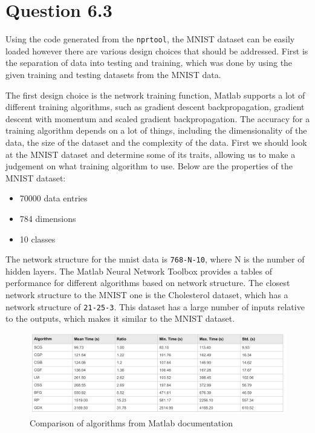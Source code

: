 \section*{Question 6.3}

Using the code generated from the \verb|nprtool|, the MNIST dataset can be easily loaded however there are various design choices that should be addressed.
First is the separation of data into testing and training, which was done by using the given training and testing datasets from the MNIST data.

The first design choice is the network training function, Matlab supports a lot of different training algorithms, such as gradient descent backpropagation, gradient descent with momentum and scaled gradient backpropagation.
The accuracy for a training algorithm depends on a lot of things, including the dimensionality of the data, the size of the dataset and the complexity of the data.
First we should look at the MNIST dataset and determine some of its traits, allowing us to make a judgement on what training algorithm to use.
Below are the properties of the MNIST dataset:
\begin{itemize}
    \item 70000 data entries
    \item 784 dimensions
    \item 10 classes
\end{itemize}

The network structure for the mnist data is \verb|768-N-10|, where N is the number of hidden layers.
The Matlab Neural Network Toolbox provides a tables of performance for different algorithms based on network structure.
The closest network structure to the MNIST one is the Cholesterol dataset, which has a network structure of \verb|21-25-3|.
This dataset has a large number of inputs relative to the outputs, which makes it similar to the MNIST dataset.

\begin{figure}[H]
    \includegraphics[width=\linewidth]{algorithm_comparison}
    \centering
    \caption{Comparison of algorithms from Matlab documentation\cite{matlabdocs}}
\end{figure}

